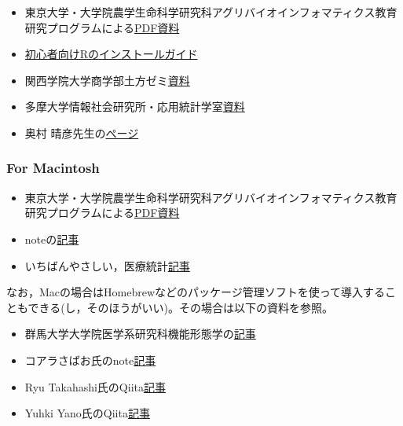 \documentclass[
  a4paper,
]{ltjsbook}
\providecommand{\tightlist}{%
  \setlength{\itemsep}{0pt}\setlength{\parskip}{0pt}}\usepackage{longtable,booktabs,array}
\begin{document}
\begin{itemize}
\tightlist
\item
  東京大学・大学院農学生命科学研究科アグリバイオインフォマティクス教育研究プログラムによる\href{https://www.iu.a.u-tokyo.ac.jp/textbook/R/R1.010_win.pdf}{PDF資料}
\item
  \href{https://syunsuke.github.io/r_install_guide_for_beginners/}{初心者向けRのインストールガイド}
\item
  関西学院大学商学部土方ゼミ\href{http://soc-research.org/ja/r_install_windows/}{資料}
\item
  多摩大学情報社会研究所・応用統計学室\href{多摩大学情報社会研究所・応用統計学室}{資料}
\item
  奥村
  晴彦先生の\href{https://okumuralab.org/~okumura/stat/R-win.html}{ページ}
\end{itemize}

\subsubsection{For Macintosh}\label{for-macintosh}

\begin{itemize}
\tightlist
\item
  東京大学・大学院農学生命科学研究科アグリバイオインフォマティクス教育研究プログラムによる\href{https://www.iu.a.u-tokyo.ac.jp/textbook/R/R1.010_mac.pdf}{PDF資料}
\item
  noteの\href{https://note.com/toshi_matsuura/n/n127cf28362e5}{記事}
\item
  いちばんやさしい，医療統計\href{https://best-biostatistics.com/r/rstudio_start.html\#i-3}{記事}
\end{itemize}

なお，Macの場合はHomebrewなどのパッケージ管理ソフトを使って導入することもできる(し，そのほうがいい)。その場合は以下の資料を参照。

\begin{itemize}
\tightlist
\item
  群馬大学大学院医学系研究科機能形態学の\href{https://anatomy.med.gunma-u.ac.jp/protocols/?p=979}{記事}
\item
  コアラさばお氏のnote\href{https://note.com/mackerelman/n/nfbf8054e90d5}{記事}
\item
  Ryu
  Takahashi氏のQiita\href{https://qiita.com/ryu-takahashi2718/items/1118cad7a4ef4900da96}{記事}
\item
  Yuhki
  Yano氏のQiita\href{https://qiita.com/y-vectorfield/items/dd1a8e2715cace9981ec}{記事}
\end{itemize}
\end{document}
